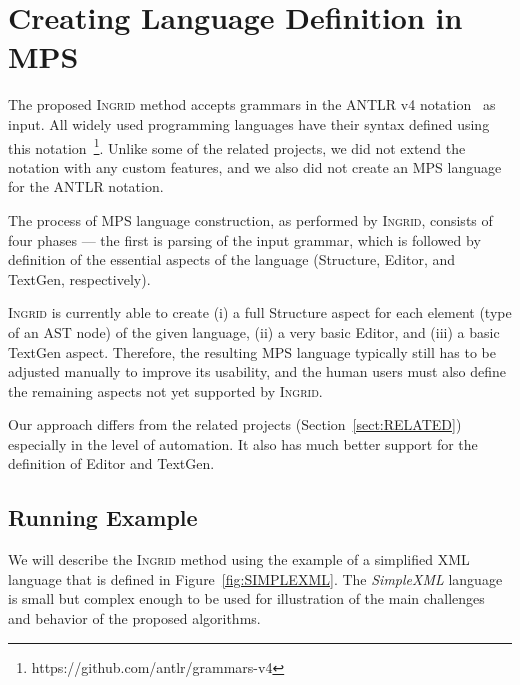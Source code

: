 \section{Creating Language Definition in MPS}
\label{sect:LANGDEF}

The proposed \textsc{Ingrid} method accepts grammars in the ANTLR v4 notation~\cite{ref:ANTLRBOOK} as input.
All widely used programming languages have their syntax defined using this notation~\footnote{https://github.com/antlr/grammars-v4}.
Unlike some of the related projects, we did not extend the notation with any custom features, and we also did not create an MPS language for the ANTLR notation.

The process of MPS language construction, as performed by \textsc{Ingrid}, consists of four phases --- the first is parsing of the input grammar, which is followed by definition of the essential aspects of the language (Structure, Editor, and TextGen, respectively).

\textsc{Ingrid} is currently able to create (i) a full Structure aspect for each element (type of an AST node) of the given language, (ii) a very basic Editor, and (iii) a basic TextGen aspect.
Therefore, the resulting MPS language typically still has to be adjusted manually to improve its usability, and the human users must also define the remaining aspects not yet supported by \textsc{Ingrid}.

Our approach differs from the related projects (Section~\ref{sect:RELATED}) especially in the level of automation. It also has much better support for the definition of Editor and TextGen.

\subsection{Running Example}

We will describe the \textsc{Ingrid} method using the example of a simplified XML language that is defined in Figure~\ref{fig:SIMPLEXML}.
The \emph{SimpleXML} language is small but complex enough to be used for illustration of the main challenges and behavior of the proposed algorithms.


